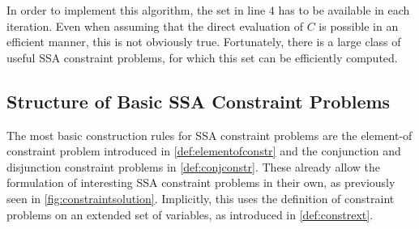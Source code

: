     
    In order to implement this algorithm, the set in line $4$ has to be
    available in each iteration.
    Even when assuming that the direct evaluation of $C$ is possible in an
    efficient manner, this is not obviously true.
    Fortunately, there is a large class of useful SSA constraint problems, for
    which this set can be efficiently computed.

\subsection{Structure of Basic SSA Constraint Problems}

    The most basic construction rules for SSA constraint problems are the
    element-of constraint problem introduced in \autoref{def:elementofconstr}
    and the conjunction and disjunction constraint problems in
    \autoref{def:conjconstr}.
    These already allow the formulation of interesting SSA constraint problems
    in their own, as previously seen in \autoref{fig:constraintsolution}.
    Implicitly, this uses the definition of constraint problems on an
    extended set of variables, as introduced in \autoref{def:constrext}.

